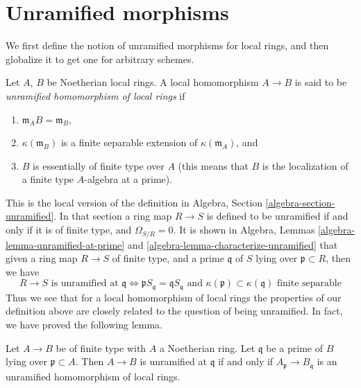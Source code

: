 \section{Unramified morphisms}
\label{section-unramified-definition}

\noindent
We first define the notion of unramified morphisms for local rings, and then
globalize it to get one for arbitrary schemes.

\begin{definition}
\label{definition-unramified-rings}
Let $A$, $B$ be Noetherian local rings. A local homomorphism $A \to B$
is said to be {\it unramified homomorphism of local rings} if
\begin{enumerate}
\item $\mathfrak m_AB = \mathfrak m_B$,
\item $\kappa(\mathfrak m_B)$ is a finite separable extension of
$\kappa(\mathfrak m_A)$, and
\item $B$ is essentially of finite type over $A$ (this means
that $B$ is the localization of a finite type $A$-algebra at a prime).
\end{enumerate}
\end{definition}

\noindent
This is the local version of the
definition in Algebra, Section \ref{algebra-section-unramified}.
In that section a ring map $R \to S$ is defined to be unramified if and
only if it is of finite type, and $\Omega_{S/R} = 0$.
It is shown in
Algebra, Lemmas \ref{algebra-lemma-unramified-at-prime} and
\ref{algebra-lemma-characterize-unramified} that given a ring
map $R \to S$ of finite type, and a prime $\mathfrak q$ of $S$
lying over $\mathfrak p \subset R$, then we have
$$
R \to S\text{ is unramified at }\mathfrak q
\Leftrightarrow
\mathfrak pS_{\mathfrak q} = \mathfrak q S_{\mathfrak q}
\text{ and }
\kappa(\mathfrak p) \subset \kappa(\mathfrak q)\text{ finite separable}
$$
Thus we see that for a local homomorphism of local rings the properties
of our definition above are closely related to the question of
being unramified. In fact, we have proved the following lemma.

\begin{lemma}
\label{lemma-characterize-unramified-Noetherian}
Let $A \to B$ be of finite type with $A$ a Noetherian ring.
Let $\mathfrak q$ be a prime of $B$ lying over $\mathfrak p \subset A$.
Then $A \to B$ is unramified at $\mathfrak q$ if and only if
$A_{\mathfrak p} \to B_{\mathfrak q}$ is an unramified homomorphism
of local rings.
\end{lemma}

